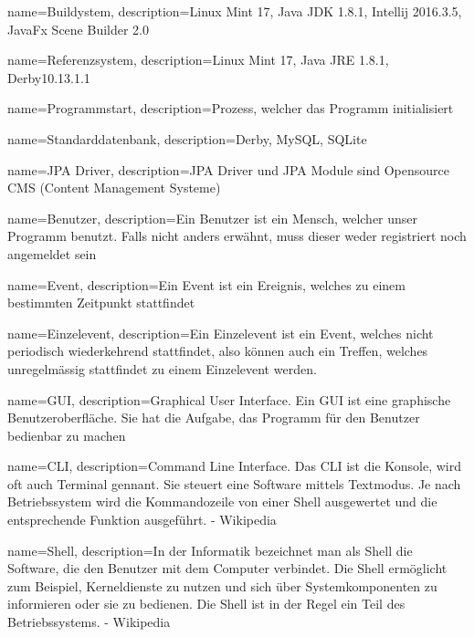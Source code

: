 
{
  name=Buildystem,
  description={Linux Mint 17, Java JDK 1.8.1, Intellij 2016.3.5, JavaFx Scene Builder 2.0}
} 

{
  name=Referenzsystem,
  description={Linux Mint 17, Java JRE 1.8.1, Derby10.13.1.1}
} 

{
  name=Programmstart,
  description={Prozess, welcher das Programm initialisiert}
} 


 
{
  name=Standarddatenbank,
  description={Derby, MySQL, SQLite}
} 


{
  name=JPA Driver,
  description={JPA Driver und JPA Module sind Opensource CMS (Content Management Systeme)}
} 

{
  name=Benutzer,
  description={Ein Benutzer ist ein Mensch, welcher unser Programm benutzt. Falls nicht anders erwähnt, muss dieser
  weder registriert noch angemeldet sein}
} 


{
  name=Event,
  description={Ein Event ist ein Ereignis, welches zu einem bestimmten Zeitpunkt stattfindet}
} 

{
  name=Einzelevent,
  description={Ein Einzelevent ist ein Event, welches nicht periodisch wiederkehrend stattfindet, also können auch
   ein Treffen, welches unregelmässig stattfindet zu einem Einzelevent werden.}
} 

{
  name=GUI,
  description={Graphical User Interface. Ein GUI ist eine graphische Benutzeroberfläche. Sie hat die Aufgabe, das
  Programm für den Benutzer bedienbar zu machen}
} 

{
  name=CLI,
  description={Command Line Interface. Das CLI ist die Konsole, wird oft auch Terminal gennant. Sie steuert eine
  Software mittels Textmodus. Je nach Betriebssystem wird die Kommandozeile von einer Shell ausgewertet und die
  entsprechende Funktion ausgeführt.
  - Wikipedia}
}

{
  name=Shell,
  description={In der Informatik bezeichnet man als Shell die Software, die den Benutzer mit dem Computer verbindet.
  Die Shell ermöglicht zum Beispiel, Kerneldienste zu nutzen und sich über Systemkomponenten zu informieren oder sie zu
  bedienen. Die Shell ist in der Regel ein Teil des Betriebssystems.
  - Wikipedia
  }
}



